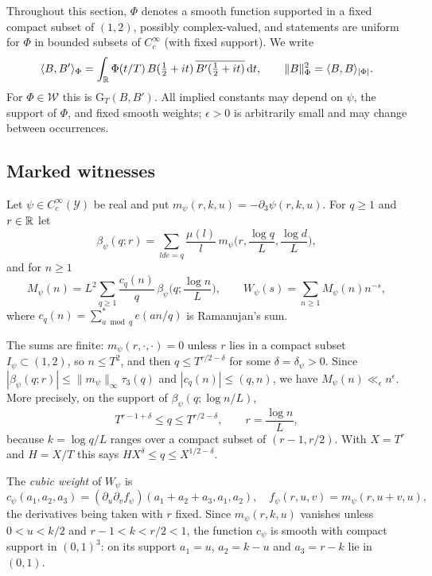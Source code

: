 \documentclass[11pt,colorlinks]{charlie}
\newcommand{\ip}[2]{\langle #1,#2\rangle}
\begin{document}
Throughout this section, $\Phi$ denotes a smooth function supported in a fixed compact subset of $(1,2)$, possibly complex-valued, and statements are uniform for $\Phi$ in bounded subsets of $C_c^\infty$ (with fixed support). We write
\[
 \ip B{B'}_\Phi=\int_\R\Phi(t/T)\,B(\tfrac12+it)\,\overline{B'(\tfrac12+it)}\dd t,\qquad\|B\|_\Phi^2=\ip BB_{|\Phi|}.
\]
For $\Phi\in\mathcal W$ this is $\mathrm G_T(B,B')$. All implied constants may depend on $\psi$, the support of $\Phi$, and fixed smooth weights; $\epsilon>0$ is arbitrarily small and may change between occurrences.

\subsection{Marked witnesses}
\begin{definition}\label{def:marked}
Let $\psi\in C_c^\infty(\mathcal Y)$ be real and put $m_\psi(r,k,u)=-\partial_3\psi(r,k,u)$. For $q\ge1$ and $r\in\mathbb{R}$ let
\[
 \beta_\psi(q;r)=\sum_{lde=q}\frac{\mu(l)}l\,m_\psi\Big(r,\frac{\log q}L,\frac{\log d}L\Big),
\]
and for $n\ge1$
\[
 M_\psi(n)=L^2\sum_{q\ge1}\frac{c_q(n)}q\,\beta_\psi\Big(q;\frac{\log n}L\Big),\qquad W_\psi(s)=\sum_{n\ge1}M_\psi(n)n^{-s},
\]
where $c_q(n)=\sum_{a\bmod q}^*e(an/q)$ is Ramanujan's sum.
\end{definition}

The sums are finite: $m_\psi(r,\cdot,\cdot)=0$ unless $r$ lies in a compact subset $I_\psi\subset(1,2)$, so $n\le T^2$, and then $q\le T^{r/2-\delta}$ for some $\delta=\delta_\psi>0$. Since $|\beta_\psi(q;r)|\le\|m_\psi\|_\infty\tau_3(q)$ and $|c_q(n)|\le(q,n)$, we have $M_\psi(n)\ll_\epsilon n^\epsilon$. More precisely, on the support of $\beta_\psi(q;\log n/L)$,
\begin{equation}\label{eq:qrange}
 T^{r-1+\delta}\le q\le T^{r/2-\delta},\qquad r=\frac{\log n}L,
\end{equation}
because $k=\log q/L$ ranges over a compact subset of $(r-1,r/2)$. With $X=T^r$ and $H=X/T$ this says $HX^{\delta}\le q\le X^{1/2-\delta}$.

The \emph{cubic weight} of $W_\psi$ is
\begin{equation}\label{eq:cpsi}
 c_\psi(a_1,a_2,a_3)=(\partial_u\partial_vf_\psi)(a_1+a_2+a_3,a_1,a_2),\quad f_\psi(r,u,v)=m_\psi(r,u+v,u),
\end{equation}
the derivatives being taken with $r$ fixed. Since $m_\psi(r,k,u)$ vanishes unless $0<u<k/2$ and $r-1<k<r/2<1$, the function $c_\psi$ is smooth with compact support in $(0,1)^3$: on its support $a_1=u$, $a_2=k-u$ and $a_3=r-k$ lie in $(0,1)$.
\end{document}
